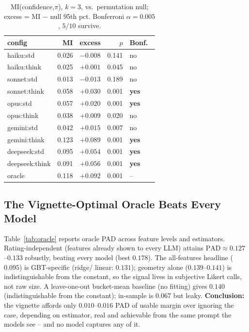 \documentclass[letterpaper]{article} %
\begin{document}
\begin{table}[t]
\centering
\setlength{\tabcolsep}{3pt}
\small
\begin{tabular}{lrrrl}
\toprule
config & MI & excess & $p$ & Bonf.\ \\
\midrule
haiku:std    & 0.026 & $-0.008$ & 0.141 & no \\
haiku:think  & 0.025 & $+0.001$ & 0.045 & no \\
sonnet:std   & 0.013 & $-0.013$ & 0.189 & no \\
sonnet:think & 0.058 & $+0.030$ & 0.001 & \textbf{yes} \\
opus:std     & 0.057 & $+0.020$ & 0.001 & \textbf{yes} \\
opus:think   & 0.038 & $+0.009$ & 0.020 & no \\
gemini:std   & 0.042 & $+0.015$ & 0.007 & no \\
gemini:think & 0.123 & $+0.089$ & 0.001 & \textbf{yes} \\
deepseek:std & 0.095 & $+0.054$ & 0.001 & \textbf{yes} \\
deepseek:think & 0.091 & $+0.056$ & 0.001 & \textbf{yes} \\
\midrule
oracle & 0.118 & $+0.092$ & 0.001 & -- \\
\bottomrule
\end{tabular}
\caption{MI(confidence,$\pi$), $k{=}3$, vs.\ permutation null; excess = MI $-$ null 95th pct. Bonferroni $\alpha{=}0.005$, $5/10$ survive.}
\label{tab:mi}
\end{table}

\subsection{The Vignette-Optimal Oracle Beats Every Model}
\label{sec:oracle-results}
Table~\ref{tab:oracle} reports oracle PAD across feature levels and
estimators. Rating-independent (features already shown to every LLM)
attains $\mathrm{PAD}\approx0.127$--$0.133$ robustly, beating every model
(best $0.178$). The all-features headline ($0.095$) is GBT-specific (ridge/
linear: $0.131$); geometry alone ($0.139$--$0.141$) is indistinguishable
from the constant, so the signal lives in subjective Likert calls, not raw
size. A leave-one-out bucket-mean baseline (no fitting) gives $0.140$
(indistinguishable from the constant); in-sample is $0.067$ but leaky.
\textbf{Conclusion:} the vignette affords only $0.010$--$0.016$ PAD of
usable margin over ignoring the case, depending on estimator, real and
achievable from the same prompt the models see -- and no model captures any
of it.
\end{document}
